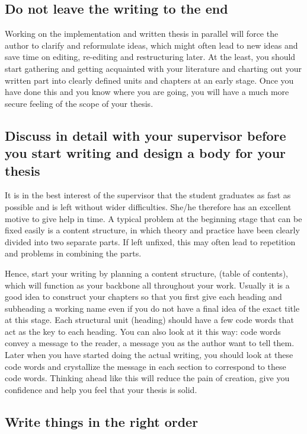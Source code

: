 \subsection{Do not leave the writing to the end}

Working on the implementation and written thesis in parallel will force the author to clarify and reformulate ideas, which might often lead to new ideas and save time on editing, re-editing and restructuring later. At the least, you should start gathering and getting acquainted with your literature and charting out your written part into clearly defined units and chapters at an early stage. Once you have done this and you know where you are going, you will have a much more secure feeling of the scope of your thesis.

\subsection{Discuss in detail with your supervisor before you start writing and design a
body for your thesis}

It is in the best interest of the supervisor that the student graduates as fast as possible and is left without wider difficulties. She/he therefore has an excellent motive to give help in time. A typical problem at the beginning stage that can be fixed easily is a content structure, in which theory and practice have been clearly divided into two separate parts. If left unfixed, this may often lead to repetition and problems in combining the parts.

Hence, start your writing by planning a content structure, (table of contents), which will function as your backbone all throughout your work. Usually it is a good idea to construct your chapters so that you first give each heading and subheading a working name even if you do not have a final idea of the exact title at this stage. Each structural unit (heading) should have a few code words that act as the key to each heading. You can also look at it this way: code words convey a message to the reader, a message you as the author want to tell them. Later when you have started doing the actual writing, you should look at these code words and crystallize the message in each section to correspond to these code words. Thinking ahead like this will reduce the pain of creation, give you confidence and help you feel that your thesis is solid.

\subsection{Write things in the right order}

